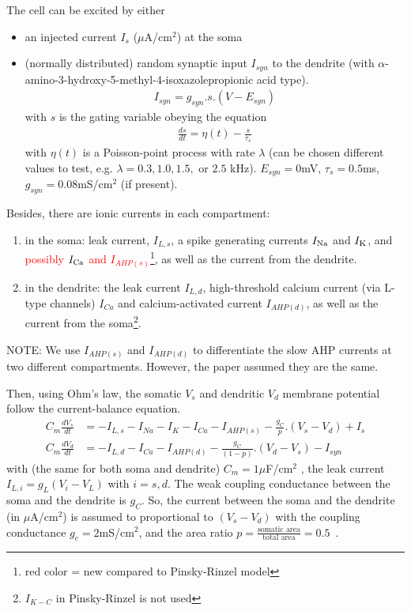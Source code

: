 The cell can be excited by either
\begin{itemize}
\item an injected current $I_{s}$ ($\mu$A/cm$^2$) at the soma
\item (normally distributed) random synaptic input $I_{syn}$ to the
  dendrite (with
  $\alpha$-amino-3-hydroxy-5-methyl-4-isoxazolepropionic acid type).
  \begin{eqnarray}
    \label{eq:553}
    I_{syn} = g_{syn}.s.(V-E_{syn})
  \end{eqnarray}
  with $s$ is the gating variable obeying the equation 
  \begin{eqnarray}
    \label{eq:554}
    \frac{ds}{dt}= \eta(t) - \frac{s}{\tau_s}
  \end{eqnarray}
  with $\eta(t)$ is a Poisson-point process with rate $\lambda$ (can be
  chosen different values to test, e.g. $\lambda = 0.3, 1.0, 1.5,$ or
  $2.5$ kHz). $E_{syn} = 0$mV, $\tau_s=0.5$ms, $g_{syn}=0.08$mS/cm$^2$
  (if present). 
\end{itemize}

Besides, there are ionic currents in each compartment:
\begin{enumerate}
\item in the soma: leak current, $I_{L,s}$, a spike generating
  currents $I_{\ce{Na}}$ and $I_{\ce{K}}$, and
  \textcolor{red}{possibly $I_{\ce{Ca}}$ and $I_{AHP(s)}$}\footnote{red
    color = new compared to Pinsky-Rinzel model}, as well as
    the current from the dendrite.

  \item in the dendrite: the leak current $I_{L,d}$, high-threshold
    calcium current (via L-type channels) $I_{Ca}$ and
    calcium-activated  current $I_{AHP(d)}$, as well as the current
    from the soma\footnote{$I_{K-C}$ in Pinsky-Rinzel is not used}.
\end{enumerate}
NOTE: We use $I_{AHP(s)}$ and $I_{AHP(d)}$ to differentiate the slow
AHP  currents at two different compartments. However, the paper
assumed they are the same. 

Then, using Ohm's law, the somatic $V_s$ and dendritic $V_d$ membrane
potential follow the current-balance equation.
\begin{eqnarray}
  \label{eq:340}
  C_m\frac{dV_s}{dt} &= -I_{L,s} - I_{Na} - I_K - I_{Ca} - I_{AHP(s)} -
  \frac{g_C}{p}.(V_s-V_d) + I_{s} \\
  C_m\frac{dV_d}{dt} &= -I_{L,d} - I_{Ca} - I_{AHP(d)} -
  \frac{g_C}{(1-p)}.(V_d-V_s) - I_{syn} 
\end{eqnarray}
with (the same for both soma and dendrite) $C_m = 1\mu$F/cm$^2$ , the
leak current $I_{L,i}=g_L(V_i-V_L)$ with $i=s,d$. The weak coupling
conductance between the soma and the dendrite is $g_C$. So, the
current between the soma and the dendrite (in $\mu$A/cm$^2$) is
assumed to proportional to $(V_s-V_d)$ with the coupling conductance
$g_c=2$mS/cm$^2$, and the area ratio
$p=\frac{\text{somatic
    area}}{\text{total area}}=0.5$~\citep{pinsky1994inr}.


